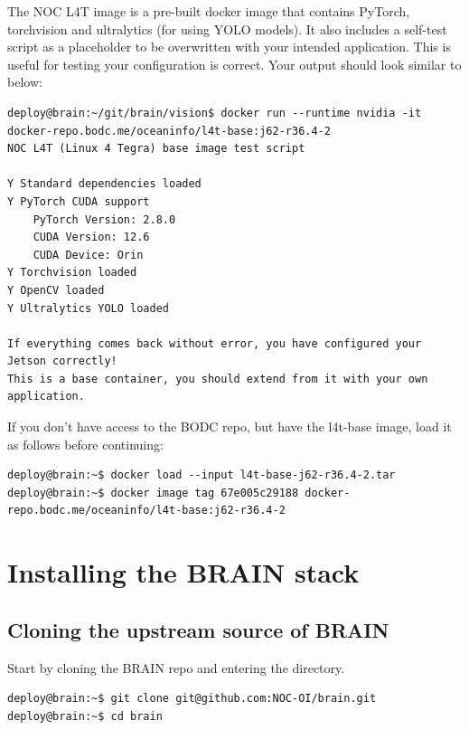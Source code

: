 \documentclass[11pt]{article}
\begin{document}
The NOC L4T image is a pre-built docker image that contains PyTorch, torchvision and ultralytics (for using YOLO models). It also includes a self-test script as a placeholder to be overwritten with your intended application. This is useful for testing your configuration is correct. Your output should look similar to below:


\lstset{style=console}
\begin{lstlisting}
deploy@brain:~/git/brain/vision$ docker run --runtime nvidia -it docker-repo.bodc.me/oceaninfo/l4t-base:j62-r36.4-2
NOC L4T (Linux 4 Tegra) base image test script

Y Standard dependencies loaded
Y PyTorch CUDA support
    PyTorch Version: 2.8.0
    CUDA Version: 12.6
    CUDA Device: Orin
Y Torchvision loaded
Y OpenCV loaded
Y Ultralytics YOLO loaded

If everything comes back without error, you have configured your Jetson correctly!
This is a base container, you should extend from it with your own application.
\end{lstlisting}

If you don't have access to the BODC repo, but have the l4t-base image, load it as follows before continuing:

\lstset{style=console}
\begin{lstlisting}
deploy@brain:~$ docker load --input l4t-base-j62-r36.4-2.tar
deploy@brain:~$ docker image tag 67e005c29188 docker-repo.bodc.me/oceaninfo/l4t-base:j62-r36.4-2
\end{lstlisting}

\newpage

\section{Installing the BRAIN stack}

\subsection{Cloning the upstream source of BRAIN}

Start by cloning the BRAIN repo and entering the directory.

\lstset{style=console}
\begin{lstlisting}
deploy@brain:~$ git clone git@github.com:NOC-OI/brain.git
deploy@brain:~$ cd brain
\end{lstlisting}
\end{document}
